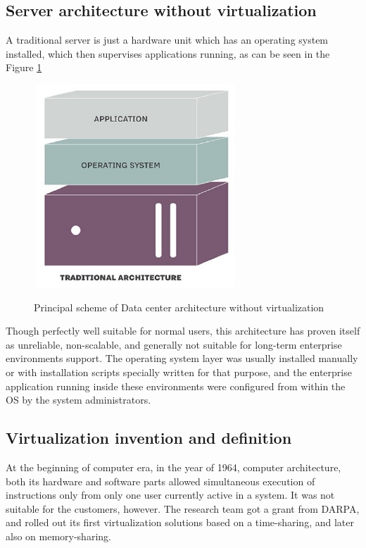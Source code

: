 \subsection{Server architecture without virtualization}

A traditional server is just a hardware unit
which has an operating system installed,
which then supervises applications running,
as can be seen in the Figure \ref{fig:TraditionalAndVirtualInfra}

\begin{figure}
\includegraphics[height=3in, width=3in]{traditional}
\caption{Principal scheme of Data center architecture without virtualization}
\cite{TraditionalAndVirtualInfra}
\label{fig:TraditionalAndVirtualInfra}
\end{figure}

Though perfectly well suitable for normal users, this architecture
has proven itself as unreliable, non-scalable,
and generally not suitable for long-term enterprise environments support.
The operating system layer was usually installed manually or with
installation scripts specially written for that purpose,
and the enterprise application running inside these
environments were configured from within the OS by the system administrators.

\subsection{Virtualization invention and definition}

At the beginning of computer era, in the year of 1964,
computer architecture, both its hardware and software
parts allowed simultaneous execution of instructions only from only one user
currently active in a system. It was not suitable for the customers, however.
The research team got a grant from DARPA, and
rolled out its first virtualization solutions based on a time-sharing,
and later also on memory-sharing.

